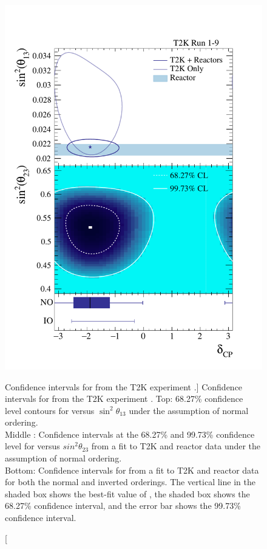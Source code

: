 \begin{figure}
	\centering
	\includegraphics[height=0.6\textheight]{figures/t2k_cp.pdf}
	\caption
	[Confidence intervals for \dcp{} from the T2K experiment \cite{Abe2019}.]
	{Confidence intervals for \dcp{} from the T2K experiment \cite{Abe2019}. 
	Top: 68.27\% confidence level contours for \dcp{} versus $\sin^2\theta_{13}$ 
	under the assumption of normal ordering. \\
	Middle : Confidence intervals at the 68.27\% and 99.73\% confidence level for 
	\dcp{} versus $sin^2\theta_{23}$ from a fit to T2K and reactor data under the 
	assumption of normal ordering. \\
	Bottom: Confidence intervals for \dcp{} from a fit to T2K and reactor data for 
	both the normal and inverted orderings. The vertical line in the shaded box 
	shows the best-fit value of \dcp{}, the shaded box shows the 68.27\% 
	confidence interval, and the error bar shows the 99.73\% confidence interval. 
	}
	\label{fig:t2k_cp}
\end{figure}

